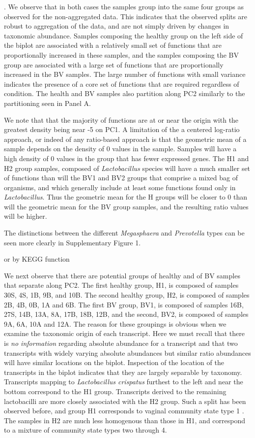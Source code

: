 \documentclass[10pt,letterpaper]{article}
\begin{document}
. We observe that in both cases the  samples group into the same four groups as observed for the non-aggregated data. This indicates that the observed splits are robust to aggregation of the data, and are not simply driven by changes in taxonomic abundance. Samples composing the healthy group on the left side of the biplot are associated with a relatively small set of functions that are proportionally increased in these samples, and the samples composing the BV group are associated with a large set of functions that are proportionally increased in the BV samples.  The large number of functions with small variance indicates the presence of a core set of functions that are required regardless of condition. The health and BV samples also partition along PC2 similarly to the partitioning seen in Panel A. 

We note that that the majority of functions are at or near the origin with the greatest density being near -5 on PC1. A limitation of the a centered log-ratio approach, or indeed of any ratio-based approach is that the geometric mean of a sample depends on the density of 0 values in the sample.  Samples will have a high density of 0 values in the group that has fewer expressed genes. The H1 and H2 group samples, composed of \emph{Lactobacillus} species will have a much smaller set of functions than will the BV1 and BV2 groups that comprise a mixed bag of organisms, and which generally include at least some functions found only in \emph{Lactobacillus}. Thus the geometric mean for the H groups will be closer to 0 than will the geometric mean for the BV group samples, and the resulting ratio values will be higher. 


The distinctions between the different \emph{Megasphaera} and \emph{Prevotella} types can be seen more clearly in Supplementary Figure 1.


 or by KEGG function \cite{Okuda:2008} 
 
We next observe that there are potential groups of healthy and of BV samples that separate along PC2. The first healthy group, H1, is composed of samples 30S, 4S, 1B, 9B, and 10B. The second healthy group, H2, is composed of samples 2B, 4B, 0B, 1A and 6B. The first BV group, BV1, is composed of samples 16B, 27S, 14B, 13A, 8A, 17B, 18B, 12B, and the second, BV2, is composed of samples 9A, 6A, 10A and 12A. The reason for these groupings is obvious when we examine the taxonomic origin of each transcript.  Here we must recall that there is \emph{no information} regarding absolute abundance for a transcript and that two transcripts with widely varying absolute abundances but similar ratio abundances will have similar locations on the biplot. Inspection of the location of the transcripts in the biplot indicates that they are largely separable by taxonomy. Transcripts mapping to \emph{Lactobacillus crispatus}  furthest to the left and near the bottom correspond to the H1 group. Transcripts derived to the remaining lactobacilli are more closely associated with the H2 group. Such a split has been observed before, and group H1 corresponds to vaginal community state type 1 \cite{Ravel:2010}. The samples in H2 are much less homogenous than those in H1, and correspond  to a mixture of community state types two through 4. 
\end{document}
